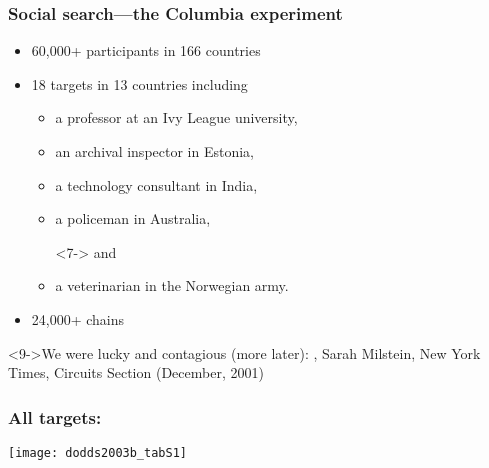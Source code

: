 \begin{frame}
  \frametitle{Social search---the Columbia experiment}

  \begin{block}{}
  \begin{itemize}
  \item<1-> 
    60,000+ participants in 166 countries
  \item<2-> 
    18 targets in 13 countries including
    \begin{itemize}
    \item<3-> 
      a professor at an Ivy League university,\\
    \item<4-> 
      an archival inspector in Estonia,\\
    \item<5-> 
      a technology consultant in India,\\
    \item<6-> 
      a policeman in Australia,\\
    \item[]<7-> 
      and 
    \item<7-> 
      a veterinarian in the Norwegian army.
    \end{itemize}
  \item<8->
    24,000+ chains
  \end{itemize}
  \end{block}

  \begin{block}<9->{We were lucky and contagious (more later):}
    , Sarah Milstein, New York Times, Circuits Section (December, 2001)
  \end{block}

\end{frame}

\begin{frame}
  \frametitle{All targets:}

  \begin{block}{}
    \texttt{[image: dodds2003b\_tabS1]}
  \end{block}

\end{frame}

